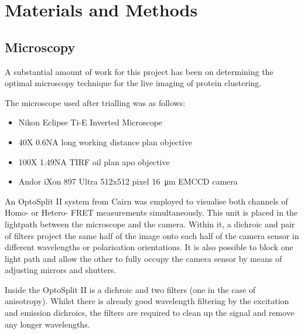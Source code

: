 \documentclass[../main.tex]{subfiles}
\begin{document}
\section{Materials and Methods}

\subsection{Microscopy}

A substantial amount of work for this project has been on determining the optimal microscopy technique for the live imaging of protein clustering.

The microscope used after trialling was as follows:

\begin{itemize}
\item{Nikon Eclipse Ti-E Inverted Microscope}
\item{40X 0.6NA long working distance plan objective}
\item{100X 1.49NA TIRF oil plan apo objective}
\item{Andor iXon 897 Ultra 512x512 pixel \SI{16}{\micro\meter} EMCCD camera}
\end{itemize}

An OptoSplit II system from Cairn was employed to visualise both channels of Homo- or Hetero- FRET measurements simultaneously. This unit is placed in the lightpath between the microscope and the camera. Within it, a dichroic and pair of filters project the same half of the image onto each half of the camera sensor in different wavelengths or polarisation orientations. It is also possible to block one light path and allow the other to fully occupy the camera sensor by means of adjusting mirrors and shutters.

Inside the OptoSplit II is a dichroic and two filters (one in the case of anisotropy). Whilst there is already good wavelength filtering by the excitation and emission dichroics, the filters are required to clean up the signal and remove any longer wavelengths.
\end{document}
